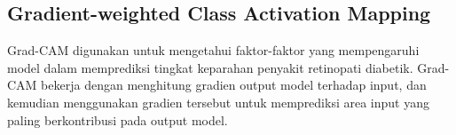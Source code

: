 \subsection{Gradient-weighted Class Activation Mapping}
Grad-CAM digunakan untuk mengetahui faktor-faktor yang mempengaruhi model dalam memprediksi tingkat keparahan penyakit retinopati diabetik. Grad-CAM bekerja dengan menghitung gradien output model terhadap input, dan kemudian menggunakan gradien tersebut untuk memprediksi area input yang paling berkontribusi pada output model.
